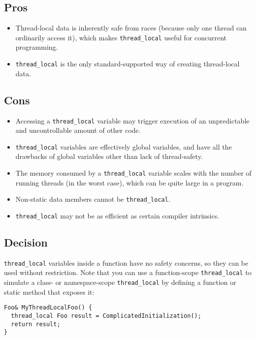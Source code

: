 \subsection{Pros}
\begin{itemize}
    \item Thread-local data is inherently safe from races (because only one thread can ordinarily access it), which makes \texttt{thread_local} useful for concurrent programming.
    \item \texttt{thread_local} is the only standard-supported way of creating thread-local data.
\end{itemize}

\subsection{Cons}
\begin{itemize}
    \item Accessing a \texttt{thread_local} variable may trigger execution of an unpredictable and uncontrollable amount of other code.
    \item \texttt{thread_local} variables are effectively global variables, and have all the drawbacks of global variables other than lack of thread-safety.
    \item The memory consumed by a \texttt{thread_local} variable scales with the number of running threads (in the worst case), which can be quite large in a program.
    \item Non-static data members cannot be \texttt{thread_local}.
    \item \texttt{thread_local} may not be as efficient as certain compiler intrinsics.
\end{itemize}

\subsection{Decision}
\texttt{thread_local} variables inside a function have no safety concerns, so they can be used without restriction. Note that you can use a function-scope \texttt{thread_local} to simulate a class- or namespace-scope \texttt{thread_local} by defining a function or static method that exposes it:
\begin{verbatim}
Foo& MyThreadLocalFoo() {
  thread_local Foo result = ComplicatedInitialization();
  return result;
}
\end{verbatim}

